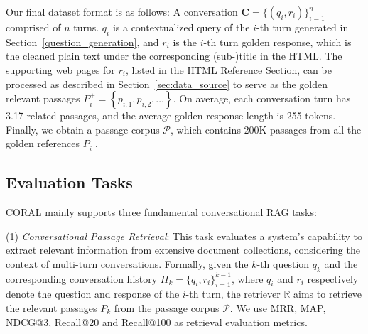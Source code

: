 \documentclass[11pt]{article}
\begin{document}
Our final dataset format is as follows: A conversation $\mathbf{C}=\{ (q_{i},r_{i})\}_{i=1}^{n}$ comprised of $n$ turns. $q_{i}$ is a contextualized query of the $i$-th turn generated in Section~\ref{question_generation}, and $r_{i}$ is the $i$-th turn golden response, which is the cleaned plain text under the corresponding (sub-)title in the HTML.
The supporting web pages for $r_{i}$, listed in the HTML Reference Section, can be processed as described in Section~\ref{sec:data_source} to serve as the golden relevant passages $P_i^+ = \left\{ p_{i,1}, p_{i,2}, \ldots \right\}$.
On average, each conversation turn has 3.17 related passages, and the average golden response length is 255 tokens. Finally, we obtain a passage corpus $\mathcal{P} $, which contains 200K passages from all the golden references $P_i^+$.






\subsection{Evaluation Tasks}
CORAL mainly supports three fundamental conversational RAG tasks:

(1) \textit{Conversational Passage Retrieval}:
This task evaluates a system's capability to extract relevant information from extensive document collections, considering the context of multi-turn conversations. Formally, given the $k$-th question $q_{k}$ and the corresponding conversation history
$H_{k} = \{ q_{i},r_{i}\}_{i=1}^{k-1}$, where $q
_{i}$ and $r_{i}$ respectively denote the question and response of the $i$-th turn, the retriever $\mathbb{R} $ aims to retrieve the relevant passages
$P_{k} $
from the passage corpus $\mathcal{P} $. 
We use
MRR, MAP, NDCG@3, Recall@20 and
Recall@100 as retrieval evaluation metrics.
\end{document}
